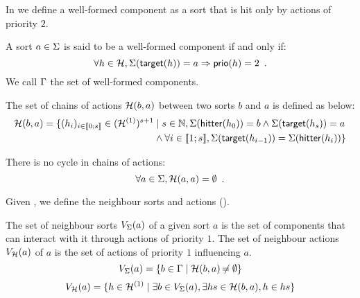In  we define a well-formed component as a sort that is hit only by actions of priority $2$.
\begin{definition}
\label{def:component}
  A sort $a \in \Sigma$ is said to be a well-formed component if and only if:
  $$\forall h \in \mathcal{H}, \Sigma(\mathsf{target}(h)) = a \Rightarrow \mathsf{prio}(h) = 2 \enspace.$$
  We call $\Gamma$ the set of well-formed components.
\end{definition}

\begin{definition}
\label{def:chainsactions}
  The set of chains of actions $\mathcal{H}(b, a)$ between two sorts $b$ and $a$ is defined as below:
  \begin{align*}
  \mathcal{H}(b, a) = \{ (h_i)_{i \in \llbracket 0; s \rrbracket} \in (\mathcal{H}^{(1)})^{s+1} &\mid s \in \mathbb{N}, \Sigma(\mathsf{hitter}(h_0)) = b \wedge \Sigma(\mathsf{target}(h_s)) = a \\
    & \wedge \forall i \in \llbracket 1; s \rrbracket, \Sigma(\mathsf{target}(h_{i-1})) = \Sigma(\mathsf{hitter}(h_{i})) \}
  \end{align*}
\end{definition}

\begin{criterion}
\label{cr:cyclefreeness}
  There is no cycle in chains of actions:
  $$\forall a \in \Sigma, \mathcal{H}(a, a) = \emptyset \enspace.$$
\end{criterion}

Given , we define the neighbour  sorts and actions ().
\begin{definition}
\label{def:neighbors}
  The set of neighbour sorts $V_\Sigma(a)$ of a given sort $a$ is the set of components that can interact with it through actions of priority $1$.
  The set of neighbour actions $V_{\mathcal{H}}(a)$ of $a$ is the set of actions of priority $1$ influencing $a$.
  $$V_\Sigma(a) = \{ b \in \Gamma \mid \mathcal{H}(b, a) \not\nobreak\mkern -2mu = \emptyset \}$$
  $$V_{\mathcal{H}}(a) = \{ h \in \mathcal{H}^{(1)} \mid \exists b \in V_\Sigma(a), \exists hs \in \mathcal{H}(b,a), h \in hs \}$$
\end{definition}

